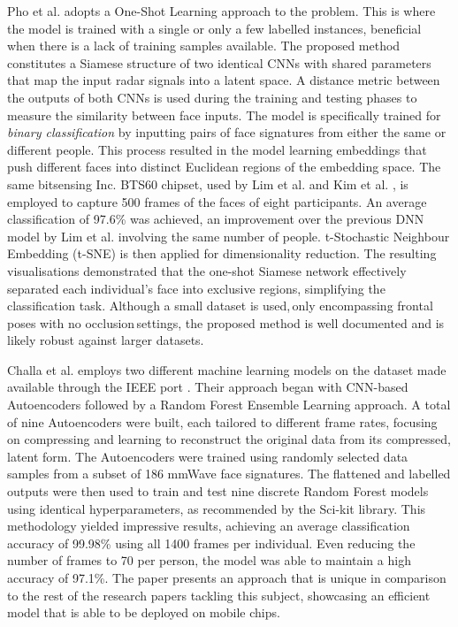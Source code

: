 \documentclass{interim}
\begin{document}
Pho et al. \cite{pho2021radar} adopts a One-Shot Learning approach to the problem. This is where the model is trained with a single or only a few labelled instances, beneficial when there is a lack of training samples available. The proposed method constitutes a Siamese structure of two identical CNNs with shared parameters that map the input radar signals into a latent space. A distance metric between the outputs of both CNNs is used during the training and testing phases to measure the similarity between face inputs. The model is specifically trained for \textit{binary classification} by inputting pairs of face signatures from either the same or different people. This process resulted in the model learning embeddings that push different faces into distinct Euclidean regions of the embedding space. The same bitsensing Inc. BTS60 chipset, used by Lim et al. and Kim et al. \cite{lim2020dnn, kim2020face}, is employed to capture 500 frames of the faces of eight participants. An average classification of 97.6\% was achieved, an improvement over the previous DNN model by Lim et al. involving the same number of people. t-Stochastic Neighbour Embedding (t-SNE) \cite{van2008visualizing} is then applied for dimensionality reduction. The resulting visualisations demonstrated that the one-shot Siamese network effectively separated each individual's face into exclusive regions, simplifying the classification task. Although a small dataset is used,\,only encompassing frontal poses with no occlusion\,settings, the proposed method is well documented and is likely robust against larger datasets.

Challa et al. \cite{challa2021face} employs two different machine learning models on the dataset made available through the IEEE port \cite{mmwavefacedata}. Their approach began with CNN-based Autoencoders followed by a Random Forest Ensemble Learning approach. A total of nine Autoencoders were built, each tailored to different frame rates, focusing on compressing and learning to reconstruct the original data from its compressed, latent form. The Autoencoders were trained using randomly selected data samples from a subset of 186 mmWave face signatures. The flattened and labelled outputs were then used to train and test nine discrete Random Forest models using identical hyperparameters, as recommended by the Sci-kit library. This methodology yielded impressive results, achieving an average classification accuracy of 99.98\% using all 1400 frames per individual. Even reducing the number of frames to 70 per person, the model was able to maintain a high accuracy of 97.1\%. The paper presents an approach that is unique in comparison to the rest of the research papers tackling this subject, showcasing an efficient model that is able to be deployed on mobile chips.
\end{document}
